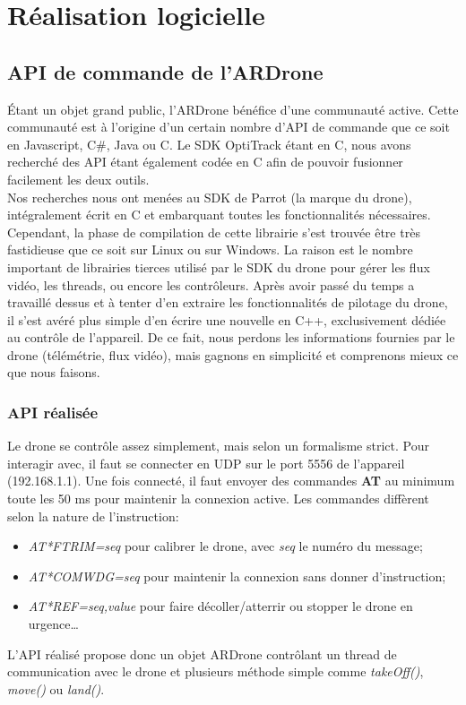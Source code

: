 \chapter{Réalisation logicielle}

    \section{API de commande de l'ARDrone}
        Étant un objet grand public, l'ARDrone bénéfice d'une communauté active. Cette communauté est à l'origine d'un certain nombre d'API de commande que ce soit en Javascript, C\#, Java ou C. Le SDK OptiTrack étant en C, nous avons recherché des API étant également codée en C afin de pouvoir fusionner facilement les deux outils.\\

        Nos recherches nous ont menées au SDK de Parrot (la marque du drone), intégralement écrit en C et embarquant toutes les fonctionnalités nécessaires. Cependant, la phase de compilation de cette librairie s'est trouvée être très fastidieuse que ce soit sur Linux ou sur Windows. La raison est le nombre important de librairies tierces utilisé par le SDK du drone pour gérer les flux vidéo, les threads, ou encore les contrôleurs. Après avoir passé du temps a travaillé dessus et à tenter d'en extraire les fonctionnalités de pilotage du drone, il s'est avéré plus simple d'en écrire une nouvelle en C++, exclusivement dédiée au contrôle de l'appareil. De ce fait, nous perdons les informations fournies par le drone (télémétrie, flux vidéo), mais gagnons en simplicité et comprenons mieux ce que nous faisons.

    \subsection{API réalisée}
        Le drone se contrôle assez simplement, mais selon un formalisme strict. Pour interagir avec, il faut se connecter en UDP sur le port 5556 de l'appareil (192.168.1.1). Une fois connecté, il faut envoyer des commandes \textbf{AT} au minimum toute les 50 ms pour maintenir la connexion active. Les commandes diffèrent selon la nature de l'instruction:
        \begin{itemize}
            \item \textit{AT*FTRIM=seq} pour calibrer le drone, avec \textit{seq} le numéro du message;
            \item \textit{AT*COMWDG=seq} pour maintenir la connexion sans donner d'instruction;
            \item \textit{AT*REF=seq,value} pour faire décoller/atterrir ou stopper le drone en urgence…
        \end{itemize}
        L'API réalisé propose donc un objet ARDrone contrôlant un thread de communication avec le drone et plusieurs méthode simple comme \textit{takeOff()}, \textit{move()} ou \textit{land()}.


